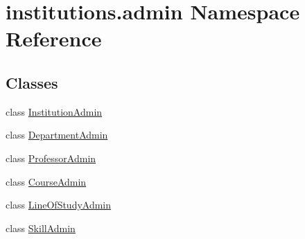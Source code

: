 \hypertarget{namespaceinstitutions_1_1admin}{\section{institutions.\-admin Namespace Reference}
\label{namespaceinstitutions_1_1admin}
}
\subsection*{Classes}
\begin{DoxyCompactItemize}
\item 
class \hyperlink{classinstitutions_1_1admin_1_1_institution_admin}{Institution\-Admin}
\item 
class \hyperlink{classinstitutions_1_1admin_1_1_department_admin}{Department\-Admin}
\item 
class \hyperlink{classinstitutions_1_1admin_1_1_professor_admin}{Professor\-Admin}
\item 
class \hyperlink{classinstitutions_1_1admin_1_1_course_admin}{Course\-Admin}
\item 
class \hyperlink{classinstitutions_1_1admin_1_1_line_of_study_admin}{Line\-Of\-Study\-Admin}
\item 
class \hyperlink{classinstitutions_1_1admin_1_1_skill_admin}{Skill\-Admin}
\end{DoxyCompactItemize}
